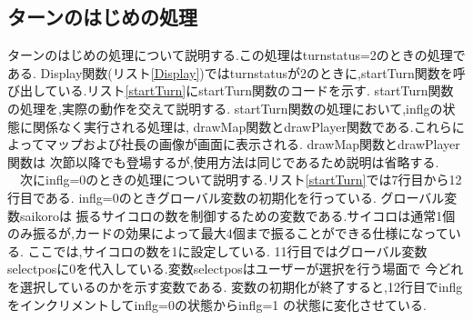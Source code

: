 \documentclass[a4j]{jarticle}
\begin{document}
    \subsection{ターンのはじめの処理}
    ターンのはじめの処理について説明する.この処理はturnstatus=2のときの処理である.     
    Display関数(リスト\ref{Display})ではturnstatusが2のときに,startTurn関数を呼び出している.リスト\ref{startTurn}にstartTurn関数のコードを示す.
    startTurn関数の処理を,実際の動作を交えて説明する. startTurn関数の処理において,inflgの状態に関係なく実行される処理は,
    drawMap関数とdrawPlayer関数である.これらによってマップおよび社長の画像が画面に表示される. drawMap関数とdrawPlayer関数は
    次節以降でも登場するが,使用方法は同じであるため説明は省略する.\\
    　次にinflg=0のときの処理について説明する.リスト\ref{startTurn}では7行目から12行目である.
    inflg=0のときグローバル変数の初期化を行っている. グローバル変数saikoroは
    振るサイコロの数を制御するための変数である.サイコロは通常1個のみ振るが,カードの効果によって最大4個まで振ることができる仕様になっている.
    ここでは,サイコロの数を1に設定している. 11行目ではグローバル変数selectposに0を代入している.変数selectposはユーザーが選択を行う場面で
    今どれを選択しているのかを示す変数である. 変数の初期化が終了すると,12行目でinflgをインクリメントしてinflg=0の状態からinflg=1
    の状態に変化させている.\\
\end{document}
